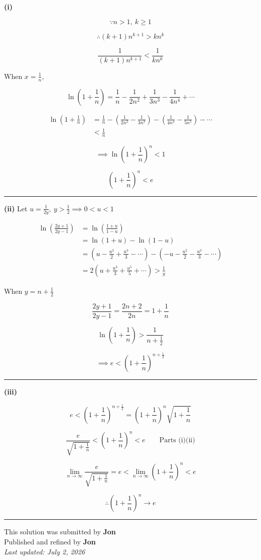 \documentclass[12pt]{article}
\begin{document}
\newcommand{\ds}{\displaystyle}

\textbf{(i)}

$$\because n>1,\ k\geq 1$$

$$\therefore(k+1)n^{k+1}>kn^k$$

$$ \frac1{(k+1)n^{k+1}}<\frac1{kn^k}$$

When $\ds x=\frac1n$,

$$\ln\left(1+\frac1n\right)=\frac1n-\frac1{2n^2}+\frac1{3n^3}-\frac1{4n^4}+\cdots$$

\begin{align*}
\ln\left(1+\frac1n\right)
&=\frac1n-\left(\frac1{2n^2}-\frac1{3n^3}\right)-\left(\frac1{4n^4}-\frac1{5n^5}\right)-\cdots\\
&<\frac1n
\end{align*}

$$\implies \ln\left(1+\frac1n\right)^n<1$$

$$\left(1+\frac1n\right)^n<e$$

\bigskip\hrule\bigskip

\textbf{(ii)} Let $\ds u=\frac1{2y},\ y>\frac12\implies 0<u<1$

\begin{align*}
\ln\left(\frac{2y+1}{2y-1}\right)
&=\ln\left(\frac{1+u}{1-u}\right)\\
&=\ln(1+u)-\ln(1-u)\\
&=\left(u-\frac{u^2}{2}+\frac{u^3}{3}-\cdots\right)
-\left(-u-\frac{u^2}{2}-\frac{u^3}{3}-\cdots\right)\\
&=2\left(u+\frac{u^3}{3}+\frac{u^5}{5}+\cdots\right)>\frac1y
\end{align*}

When $\ds y=n+\frac12$

$$\frac{2y+1}{2y-1}=\frac{2n+2}{2n}=1+\frac1n$$

$$\ln\left(1+\frac1n\right)>\frac1{n+\frac12}$$

$$\implies e<\left(1+\frac1n\right)^{n+\frac12}$$

\bigskip\hrule\bigskip

\textbf{(iii)}


$$e<\left(1+\frac1n\right)^{n+\frac12}
=\left(1+\frac1n\right)^n\sqrt{1+\frac1n}$$

$$\frac{e}{\sqrt{1+\frac1n}}<\left(1+\frac1n\right)^n<e\qquad \text{Parts (i)(ii)}$$

$$\lim_{n\to\infty}\frac{e}{\sqrt{1+\frac1n}}=e<\lim_{n\to\infty}\left(1+\frac1n\right)^n<e$$

$$\therefore \left(1+\frac1n\right)^n\to e$$

\bigskip
\hrule
\begin{center}
    This solution was submitted by \textbf{Jon}\\[4pt]
    Published and refined by \textbf{Jon}\\[8pt]
    \textit{Last updated: July 2, 2026}
\end{center}
\end{document}
